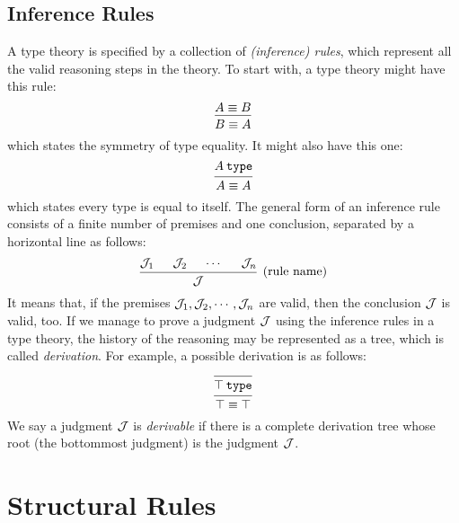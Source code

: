 \documentclass[11pt]{article}
\begin{document}
\subsection{Inference Rules}

A type theory is specified by a collection of \emph{(inference) rules},
which represent all the valid reasoning steps in the theory.
To start with, a type theory might have this rule:
\[
  \begin{prooftree}
    \hypo{\eqtype{A}{B}}
    \infer1{\eqtype{B}{A}}
  \end{prooftree}
\]
which states the symmetry of type equality.
It might also have this one:
\[
  \begin{prooftree}
    \hypo{\istype{A}}
    \infer1{\eqtype{A}{A}}
  \end{prooftree}
\]
which states every type is equal to itself.
The general form of an inference rule consists of a finite number of premises and one conclusion,
separated by a horizontal line as follows:
\[
  \begin{prooftree}
    \hypo{\JJ_1}
    \hypo{\JJ_2}
    \hypo{\cdots}
    \hypo{\JJ_n}
    \infer4[(rule name)]{\JJ}
  \end{prooftree}
\]
It means that, if the premises $\mathcal{J}_1, \mathcal{J}_2, \cdots, \mathcal{J}_n$ are valid, then the conclusion $\mathcal{J}$ is valid, too.
If we manage to prove a judgment $\mathcal{J}$ using the inference rules in a type theory,
the history of the reasoning may be represented as a tree, which is called \emph{derivation}.
For example, a possible derivation is as follows:
\[
  \begin{prooftree}
    \infer0{\istype{\unittype}}
    \infer1{\eqtype{\unittype}{\unittype}}
  \end{prooftree}
\]
We say a judgment $\mathcal{J}$ is \emph{derivable} if there is a complete derivation tree whose root (the bottommost judgment) is the judgment $\mathcal{J}$.

\section{Structural Rules}
\end{document}
